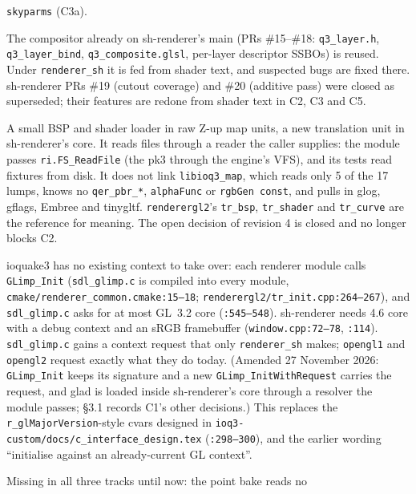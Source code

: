 \documentclass[11pt,a4paper]{article}
\begin{document}
\begin{description}[style=nextline]
  \texttt{skyparms} (C3a).
\item[The Q3 layer compositor is reference code.] The compositor already on sh-renderer's main
  (PRs \#15--\#18: \texttt{q3\_layer.h}, \texttt{q3\_layer\_bind}, \texttt{q3\_composite.glsl},
  per-layer descriptor SSBOs) is reused. Under \texttt{renderer\_sh} it is fed from shader text,
  and suspected bugs are fixed there. sh-renderer PRs \#19 (cutout coverage) and \#20 (additive
  pass) were closed as superseded; their features are redone from shader text in C2, C3 and C5.
\item[Parser decided: sh-renderer's own \texttt{loader\_q3}.] A small BSP and shader loader in raw
  Z-up map units, a new translation unit in sh-renderer's core. It reads files through a reader the
  caller supplies: the module passes \texttt{ri.FS\_ReadFile} (the pk3 through the engine's VFS),
  and its tests read fixtures from disk. It does not link \texttt{libioq3\_map}, which reads only 5
  of the 17 lumps, knows no \texttt{qer\_pbr\_*}, \texttt{alphaFunc} or \texttt{rgbGen const}, and
  pulls in glog, gflags, Embree and tinygltf. \texttt{renderergl2}'s \texttt{tr\_bsp},
  \texttt{tr\_shader} and \texttt{tr\_curve} are the reference for meaning. The open decision of
  revision 4 is closed and no longer blocks C2.
\item[GL context: requested, not taken over.] ioquake3 has no existing context to take over: each
  renderer module calls \texttt{GLimp\_Init} (\texttt{sdl\_glimp.c} is compiled into every module,
  \texttt{cmake/renderer\_common.cmake:15--18}; \texttt{renderergl2/tr\_init.cpp:264--267}), and
  \texttt{sdl\_glimp.c} asks for at most GL~3.2 core (\texttt{:545--548}). sh-renderer needs 4.6
  core with a debug context and an sRGB framebuffer (\texttt{window.cpp:72--78}, \texttt{:114}).
  \texttt{sdl\_glimp.c} gains a context request that only \texttt{renderer\_sh} makes;
  \texttt{opengl1} and \texttt{opengl2} request exactly what they do today. (Amended 27 November
  2026: \texttt{GLimp\_Init} keeps its signature and a new \texttt{GLimp\_InitWithRequest} carries
  the request, and glad is loaded inside sh-renderer's core through a resolver the module passes;
  §3.1 records C1's other decisions.) This replaces the
  \texttt{r\_glMajorVersion}-style cvars designed in \texttt{ioq3-custom/docs/c\_interface\_design.tex}
  (\texttt{:298--300}), and the earlier wording ``initialise against an already-current GL
  context''.
\item[Sky environment light.] Missing in all three tracks until now: the point bake reads no

\end{description}
\end{document}
